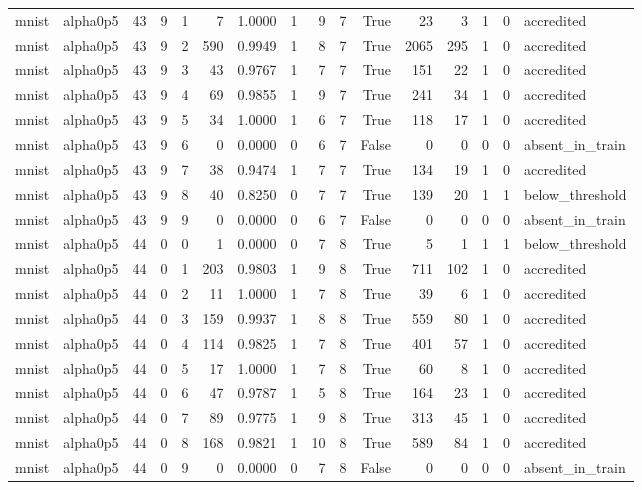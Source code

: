 \begin{tabular}{llrrrrrrrrrrrrrl}
mnist & alpha0p5 & 43 & 9 & 1 & 7 & 1.0000 & 1 & 9 & 7 & True & 23 & 3 & 1 & 0 & accredited \\
mnist & alpha0p5 & 43 & 9 & 2 & 590 & 0.9949 & 1 & 8 & 7 & True & 2065 & 295 & 1 & 0 & accredited \\
mnist & alpha0p5 & 43 & 9 & 3 & 43 & 0.9767 & 1 & 7 & 7 & True & 151 & 22 & 1 & 0 & accredited \\
mnist & alpha0p5 & 43 & 9 & 4 & 69 & 0.9855 & 1 & 9 & 7 & True & 241 & 34 & 1 & 0 & accredited \\
mnist & alpha0p5 & 43 & 9 & 5 & 34 & 1.0000 & 1 & 6 & 7 & True & 118 & 17 & 1 & 0 & accredited \\
mnist & alpha0p5 & 43 & 9 & 6 & 0 & 0.0000 & 0 & 6 & 7 & False & 0 & 0 & 0 & 0 & absent\_in\_train \\
mnist & alpha0p5 & 43 & 9 & 7 & 38 & 0.9474 & 1 & 7 & 7 & True & 134 & 19 & 1 & 0 & accredited \\
mnist & alpha0p5 & 43 & 9 & 8 & 40 & 0.8250 & 0 & 7 & 7 & True & 139 & 20 & 1 & 1 & below\_threshold \\
mnist & alpha0p5 & 43 & 9 & 9 & 0 & 0.0000 & 0 & 6 & 7 & False & 0 & 0 & 0 & 0 & absent\_in\_train \\
mnist & alpha0p5 & 44 & 0 & 0 & 1 & 0.0000 & 0 & 7 & 8 & True & 5 & 1 & 1 & 1 & below\_threshold \\
mnist & alpha0p5 & 44 & 0 & 1 & 203 & 0.9803 & 1 & 9 & 8 & True & 711 & 102 & 1 & 0 & accredited \\
mnist & alpha0p5 & 44 & 0 & 2 & 11 & 1.0000 & 1 & 7 & 8 & True & 39 & 6 & 1 & 0 & accredited \\
mnist & alpha0p5 & 44 & 0 & 3 & 159 & 0.9937 & 1 & 8 & 8 & True & 559 & 80 & 1 & 0 & accredited \\
mnist & alpha0p5 & 44 & 0 & 4 & 114 & 0.9825 & 1 & 7 & 8 & True & 401 & 57 & 1 & 0 & accredited \\
mnist & alpha0p5 & 44 & 0 & 5 & 17 & 1.0000 & 1 & 7 & 8 & True & 60 & 8 & 1 & 0 & accredited \\
mnist & alpha0p5 & 44 & 0 & 6 & 47 & 0.9787 & 1 & 5 & 8 & True & 164 & 23 & 1 & 0 & accredited \\
mnist & alpha0p5 & 44 & 0 & 7 & 89 & 0.9775 & 1 & 9 & 8 & True & 313 & 45 & 1 & 0 & accredited \\
mnist & alpha0p5 & 44 & 0 & 8 & 168 & 0.9821 & 1 & 10 & 8 & True & 589 & 84 & 1 & 0 & accredited \\
mnist & alpha0p5 & 44 & 0 & 9 & 0 & 0.0000 & 0 & 7 & 8 & False & 0 & 0 & 0 & 0 & absent\_in\_train \\

\end{tabular}
